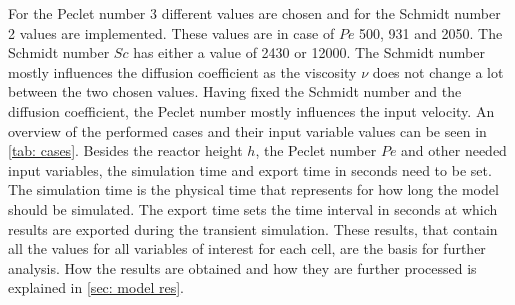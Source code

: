 \documentclass[../thesis.tex]{subfiles}
\begin{document}
For the Peclet number 3 different values are chosen and for the Schmidt number 2 values are implemented. These values are in case of $Pe$ 500, 931 and 2050. The Schmidt number $Sc$ has either a value of 2430 or 12000. The Schmidt number mostly influences the diffusion coefficient as the viscosity $\nu$ does not change a lot between the two chosen values. Having fixed the Schmidt number and the diffusion coefficient, the Peclet number mostly influences the input velocity. An overview of the performed cases and their input variable values can be seen in \autoref{tab: cases}. Besides the reactor height $h$, the Peclet number $Pe$ and other needed input variables, the simulation time and export time in seconds need to be set. The simulation time is the physical time that represents for how long the model should be simulated. The export time sets the time interval in seconds at which results are exported during the transient simulation. These results, that contain all the values for all variables of interest for each cell, are the basis for further analysis. How the results are obtained and how they are further processed is explained in \autoref{sec: model res}.
\end{document}
